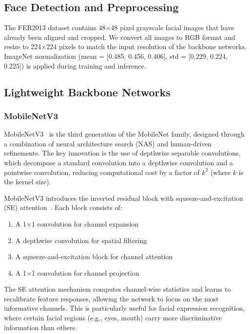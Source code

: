 \documentclass[apajournal,article,submit,pdftex,moreauthors]{Definitions/mdpi}
\begin{document}
\subsection{Face Detection and Preprocessing}

The FER2013 dataset contains 48$\times$48 pixel grayscale facial images that have already been aligned and cropped. We convert all images to RGB format and resize to 224$\times$224 pixels to match the input resolution of the backbone networks. ImageNet normalization (mean = [0.485, 0.456, 0.406], std = [0.229, 0.224, 0.225]) is applied during training and inference.

\subsection{Lightweight Backbone Networks}

\subsubsection{MobileNetV3}

MobileNetV3~\citep{howard2019mobilenetv3} is the third generation of the MobileNet family, designed through a combination of neural architecture search (NAS) and human-driven refinements. The key innovation is the use of depthwise separable convolutions, which decompose a standard convolution into a depthwise convolution and a pointwise convolution, reducing computational cost by a factor of $k^2$ (where $k$ is the kernel size).

MobileNetV3 introduces the inverted residual block with squeeze-and-excitation (SE) attention~\citep{howard2019mobilenetv3}. Each block consists of:
\begin{enumerate}
\item A 1$\times$1 convolution for channel expansion
\item A depthwise convolution for spatial filtering
\item A squeeze-and-excitation block for channel attention
\item A 1$\times$1 convolution for channel projection
\end{enumerate}

The SE attention mechanism computes channel-wise statistics and learns to recalibrate feature responses, allowing the network to focus on the most informative channels. This is particularly useful for facial expression recognition, where certain facial regions (e.g., eyes, mouth) carry more discriminative information than others.
\end{document}
